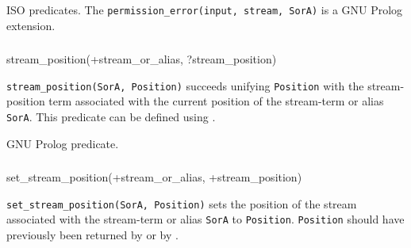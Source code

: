 \Portability

ISO predicates. The \texttt{permission\_error(input, stream, SorA)} is a
GNU Prolog extension.

\subsubsection{\label{stream-position/2}}

\begin{TemplatesOneCol}
stream\_position(+stream\_or\_alias, ?stream\_position)

\end{TemplatesOneCol}

\Description

\texttt{stream\_position(SorA, Position)} succeeds unifying
\texttt{Position} with the stream-position term associated with the current
position of the stream-term or alias \texttt{SorA}. This predicate can be
defined using  .

\begin{PlErrors}





\end{PlErrors}

\Portability

GNU Prolog predicate.

\subsubsection{\label{set-stream-position/2}}

\begin{TemplatesOneCol}
set\_stream\_position(+stream\_or\_alias, +stream\_position)

\end{TemplatesOneCol}

\Description

\texttt{set\_stream\_position(SorA, Position)} sets the position of
the stream associated with the stream-term or alias \texttt{SorA} to
\texttt{Position}. \texttt{Position} should have previously been returned by
  or by
 .

